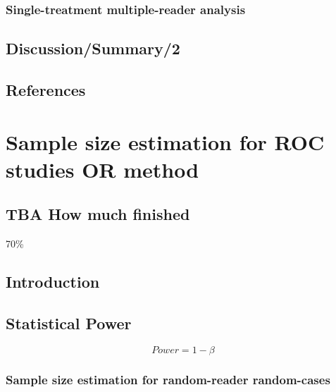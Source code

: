 \documentclass[
]{book}
\begin{document}
\hypertarget{roc-sample-size-dbm-STMRAnalysis}{%
\subsection{Single-treatment multiple-reader analysis}\label{roc-sample-size-dbm-STMRAnalysis}}

\hypertarget{discussionsummary2}{%
\section{Discussion/Summary/2}\label{discussionsummary2}}

\hypertarget{roc-sample-size-dbm-references}{%
\section{References}\label{roc-sample-size-dbm-references}}

\hypertarget{roc-sample-size-or}{%
\chapter{Sample size estimation for ROC studies OR method}\label{roc-sample-size-or}}

\hypertarget{roc-sample-size-or-how-much-finished}{%
\section{TBA How much finished}\label{roc-sample-size-or-how-much-finished}}

70\%

\hypertarget{roc-sample-size-or-introduction}{%
\section{Introduction}\label{roc-sample-size-or-introduction}}

\hypertarget{StatPower2}{%
\section{Statistical Power}\label{StatPower2}}

\begin{equation}
Power = 1 - \beta
\label{eq:DefinitionStatPower1}
\end{equation}

\hypertarget{sample-size-estimation-for-random-reader-random-cases}{%
\subsection{Sample size estimation for random-reader random-cases}\label{sample-size-estimation-for-random-reader-random-cases}}
\end{document}

